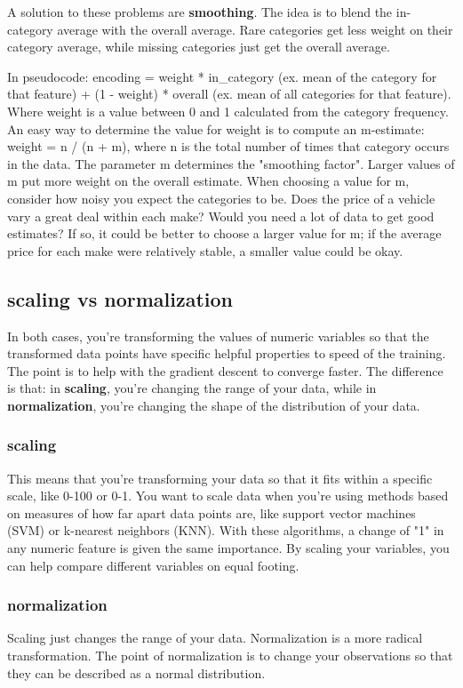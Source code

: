 \documentclass[12pt]{report}
\begin{document}
A solution to these problems are \textbf{smoothing}. The idea is to blend the in-category average with the overall average. Rare categories get less weight on their category average, while missing categories just get the overall average.

In pseudocode: encoding = weight * in\_category (ex. mean of the category for that feature) + (1 - weight) * overall (ex. mean of all categories for that feature). Where weight is a value between 0 and 1 calculated from the category frequency. An easy way to determine the value for weight is to compute an m-estimate: weight = n / (n + m), where n is the total number of times that category occurs in the data. The parameter m determines the "smoothing factor". Larger values of m put more weight on the overall estimate. When choosing a value for m, consider how noisy you expect the categories to be. Does the price of a vehicle vary a great deal within each make? Would you need a lot of data to get good estimates? If so, it could be better to choose a larger value for m; if the average price for each make were relatively stable, a smaller value could be okay.

\subsection{scaling vs normalization}

In both cases, you're transforming the values of numeric variables so that the transformed data points have specific helpful properties to speed of the training. The point is to help with the gradient descent to converge faster. The difference is that: in \textbf{scaling}, you're changing the range of your data, while in \textbf{normalization}, you're changing the shape of the distribution of your data.

\subsubsection{scaling}
This means that you're transforming your data so that it fits within a specific scale, like 0-100 or 0-1. You want to scale data when you're using methods based on measures of how far apart data points are, like support vector machines (SVM) or k-nearest neighbors (KNN). With these algorithms, a change of "1" in any numeric feature is given the same importance. By scaling your variables, you can help compare different variables on equal footing.

\subsubsection{normalization}
Scaling just changes the range of your data. Normalization is a more radical transformation. The point of normalization is to change your observations so that they can be described as a normal distribution.
\end{document}
